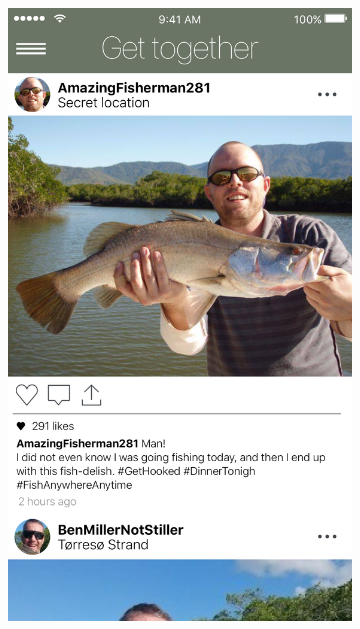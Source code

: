 \begin{figure}[H]
\begin{subfigure}[t]{0.23\textwidth}
  	  \includegraphics[width=\textwidth]{images/Together.png}
  \end{subfigure}
  \hfill
 \end{figure}
 \vfill